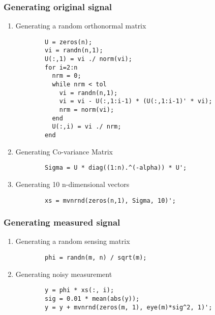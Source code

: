 \documentclass[fleqn, 11pt]{article}
\begin{document}
\subsubsection*{Generating original signal}
\begin{enumerate}
    \item Generating a random orthonormal matrix
        \begin{verbatim}
        U = zeros(n);
        vi = randn(n,1);
        U(:,1) = vi ./ norm(vi);
        for i=2:n
          nrm = 0;
          while nrm < tol
            vi = randn(n,1);
            vi = vi - U(:,1:i-1) * (U(:,1:i-1)' * vi);
            nrm = norm(vi);
          end
          U(:,i) = vi ./ nrm;
        end
        \end{verbatim}

    \item Generating Co-variance Matrix
        \begin{verbatim}
        Sigma = U * diag((1:n).^(-alpha)) * U';
        \end{verbatim}

    \item Generating 10 n-dimensional vectors
        \begin{verbatim}
        xs = mvnrnd(zeros(n,1), Sigma, 10)';
        \end{verbatim}
\end{enumerate}

\subsubsection*{Generating measured signal}
\begin{enumerate}
    \item Generating a random sensing matrix
        \begin{verbatim}
        phi = randn(m, n) / sqrt(m);
        \end{verbatim}

    \item Generating noisy measurement
        \begin{verbatim}
        y = phi * xs(:, i);
        sig = 0.01 * mean(abs(y));
        y = y + mvnrnd(zeros(m, 1), eye(m)*sig^2, 1)';
        \end{verbatim}
\end{enumerate}
\end{document}

